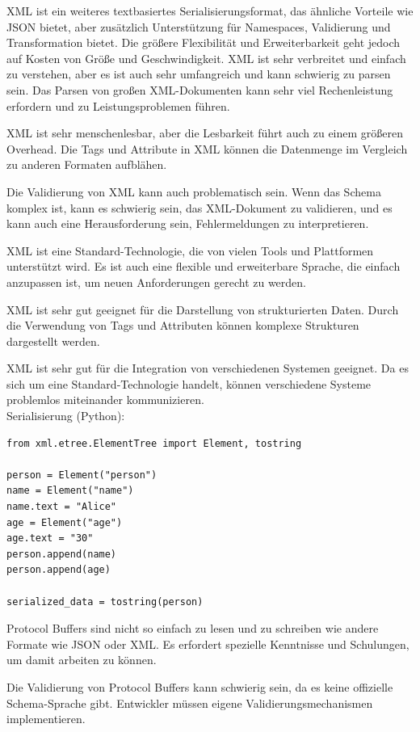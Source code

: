XML ist ein weiteres textbasiertes Serialisierungsformat, das ähnliche Vorteile wie JSON bietet, aber zusätzlich Unterstützung für Namespaces, Validierung und Transformation bietet. Die größere Flexibilität und Erweiterbarkeit geht jedoch auf Kosten von Größe und Geschwindigkeit.
XML ist sehr verbreitet und einfach zu verstehen, aber es ist auch sehr umfangreich und kann schwierig zu parsen sein. Das Parsen von großen XML-Dokumenten kann sehr viel Rechenleistung erfordern und zu Leistungsproblemen führen.

XML ist sehr menschenlesbar, aber die Lesbarkeit führt auch zu einem größeren Overhead. Die Tags und Attribute in XML können die Datenmenge im Vergleich zu anderen Formaten aufblähen.

Die Validierung von XML kann auch problematisch sein. Wenn das Schema komplex ist, kann es schwierig sein, das XML-Dokument zu validieren, und es kann auch eine Herausforderung sein, Fehlermeldungen zu interpretieren.

XML ist eine Standard-Technologie, die von vielen Tools und Plattformen unterstützt wird. Es ist auch eine flexible und erweiterbare Sprache, die einfach anzupassen ist, um neuen Anforderungen gerecht zu werden.

XML ist sehr gut geeignet für die Darstellung von strukturierten Daten. Durch die Verwendung von Tags und Attributen können komplexe Strukturen dargestellt werden.

XML ist sehr gut für die Integration von verschiedenen Systemen geeignet. Da es sich um eine Standard-Technologie handelt, können verschiedene Systeme problemlos miteinander kommunizieren.\\
Serialisierung (Python):\\
\begin{lstlisting}[caption={XML},captionpos=b,label={lst:xml}]
from xml.etree.ElementTree import Element, tostring

person = Element("person")
name = Element("name")
name.text = "Alice"
age = Element("age")
age.text = "30"
person.append(name)
person.append(age)

serialized_data = tostring(person)
\end{lstlisting}

Protocol Buffers sind nicht so einfach zu lesen und zu schreiben wie andere Formate wie JSON oder XML. Es erfordert spezielle Kenntnisse und Schulungen, um damit arbeiten zu können.

Die Validierung von Protocol Buffers kann schwierig sein, da es keine offizielle Schema-Sprache gibt. Entwickler müssen eigene Validierungsmechanismen implementieren.

